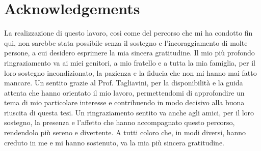 \chapter*{Acknowledgements}
La realizzazione di questo lavoro, così come del percorso che mi ha condotto fin qui, non sarebbe stata possibile senza il sostegno e l'incoraggiamento di molte persone, a cui desidero esprimere la mia sincera gratitudine.
Il mio più profondo ringraziamento va ai miei genitori, a mio fratello e a tutta la mia famiglia, per il loro sostegno incondizionato, la pazienza e la fiducia che non mi hanno mai fatto mancare.
Un sentito grazie al Prof. Tagliavini, per la disponibilità e la guida attenta che hanno orientato il mio lavoro, permettendomi di approfondire un tema di mio particolare interesse e contribuendo in modo decisivo alla buona riuscita di questa tesi.
Un ringraziamento sentito va anche agli amici, per il loro sostegno, la presenza e l'affetto che hanno accompagnato questo percorso, rendendolo più sereno e divertente.
A tutti coloro che, in modi diversi, hanno creduto in me e mi hanno sostenuto, va la mia più sincera gratitudine.